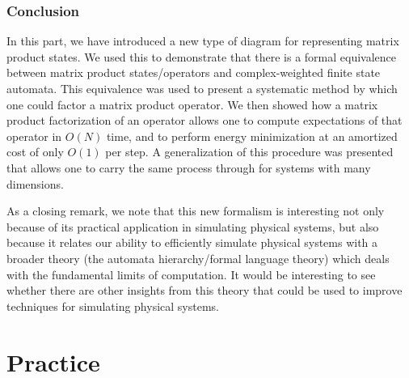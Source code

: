 \documentclass[12pt]{amsbook}
\theoremstyle{plain}
\theoremstyle{definition}
\theoremstyle{remark}
\begin{document}
\subsection{Conclusion}

In this part, we have introduced a new type of diagram for representing matrix product states.  We used this to demonstrate that there is a formal equivalence between matrix product states/operators and complex-weighted finite state automata.  This equivalence was used to present a systematic method by which one could factor a matrix product operator.  We then showed how a matrix product factorization of an operator allows one to compute expectations of that operator in $O(N)$ time, and to perform energy minimization at an amortized cost of only $O(1)$ per step.  A generalization of this procedure was presented that allows one to carry the same process through for systems with many dimensions.

As a closing remark, we note that this new formalism is interesting not only because of its practical application in simulating physical systems, but also because it relates our ability to efficiently simulate physical systems with a broader theory (the automata hierarchy/formal language theory) which deals with the fundamental limits of computation.  It would be interesting to see whether there are other insights from this theory that could be used to improve techniques for simulating physical systems.
\chapter{Practice}


\end{document}
